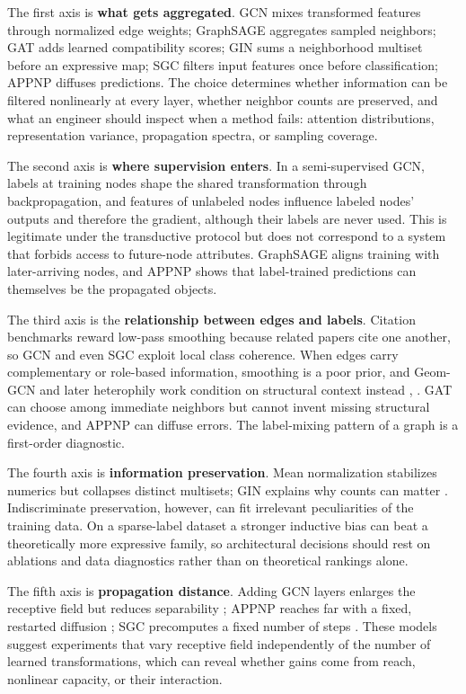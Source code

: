 \documentclass[conference]{IEEEtran}
\begin{document}
The first axis is \textbf{what gets aggregated}. GCN mixes transformed features through normalized edge weights; GraphSAGE aggregates sampled neighbors; GAT adds learned compatibility scores; GIN sums a neighborhood multiset before an expressive map; SGC filters input features once before classification; APPNP diffuses predictions. The choice determines whether information can be filtered nonlinearly at every layer, whether neighbor counts are preserved, and what an engineer should inspect when a method fails: attention distributions, representation variance, propagation spectra, or sampling coverage.

The second axis is \textbf{where supervision enters}. In a semi-supervised GCN, labels at training nodes shape the shared transformation through backpropagation, and features of unlabeled nodes influence labeled nodes' outputs and therefore the gradient, although their labels are never used. This is legitimate under the transductive protocol but does not correspond to a system that forbids access to future-node attributes. GraphSAGE aligns training with later-arriving nodes, and APPNP shows that label-trained predictions can themselves be the propagated objects.

The third axis is the \textbf{relationship between edges and labels}. Citation benchmarks reward low-pass smoothing because related papers cite one another, so GCN and even SGC exploit local class coherence. When edges carry complementary or role-based information, smoothing is a poor prior, and Geom-GCN and later heterophily work condition on structural context instead \cite{b10}, \cite{b14}. GAT can choose among immediate neighbors but cannot invent missing structural evidence, and APPNP can diffuse errors. The label-mixing pattern of a graph is a first-order diagnostic.

The fourth axis is \textbf{information preservation}. Mean normalization stabilizes numerics but collapses distinct multisets; GIN explains why counts can matter \cite{b4}. Indiscriminate preservation, however, can fit irrelevant peculiarities of the training data. On a sparse-label dataset a stronger inductive bias can beat a theoretically more expressive family, so architectural decisions should rest on ablations and data diagnostics rather than on theoretical rankings alone.

The fifth axis is \textbf{propagation distance}. Adding GCN layers enlarges the receptive field but reduces separability \cite{b7}; APPNP reaches far with a fixed, restarted diffusion \cite{b6}; SGC precomputes a fixed number of steps \cite{b5}. These models suggest experiments that vary receptive field independently of the number of learned transformations, which can reveal whether gains come from reach, nonlinear capacity, or their interaction.
\end{document}
